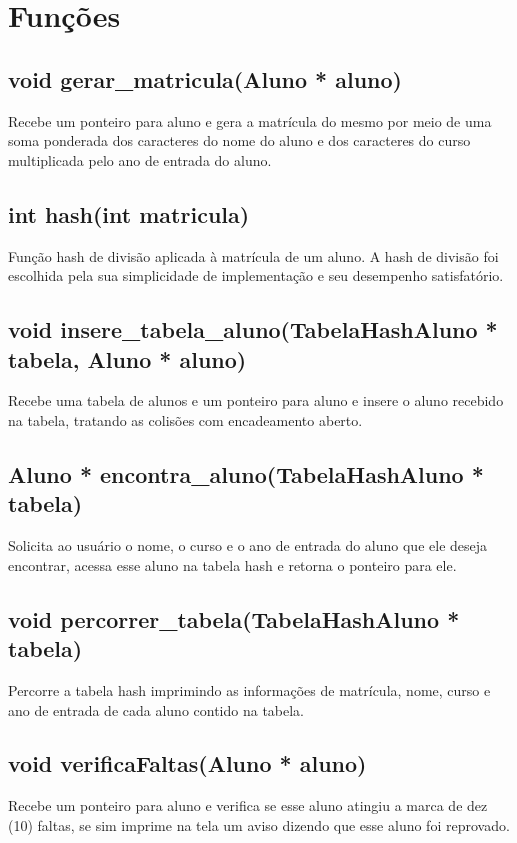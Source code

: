 \documentclass{article}
\begin{document}
\section{Funções}

\subsection{void gerar\_matricula(Aluno * aluno)}
Recebe um ponteiro para aluno e gera a matrícula do mesmo por meio de uma soma ponderada dos caracteres do nome do aluno e dos caracteres do curso multiplicada pelo ano de entrada do aluno.

\subsection{int hash(int matricula)}
Função hash de divisão aplicada à matrícula de um aluno. A hash de divisão foi escolhida pela sua simplicidade de implementação e seu desempenho satisfatório.

\subsection{void insere\_tabela\_aluno(TabelaHashAluno * tabela, Aluno * aluno)}
Recebe uma tabela de alunos e um ponteiro para aluno e insere o aluno recebido na tabela, tratando as colisões com encadeamento aberto.

\subsection{Aluno * encontra\_aluno(TabelaHashAluno * tabela)}
Solicita ao usuário o nome, o curso e o ano de entrada do aluno que ele deseja encontrar, acessa esse aluno na tabela hash e retorna o ponteiro para ele.

\subsection{void percorrer\_tabela(TabelaHashAluno * tabela)}
Percorre a tabela hash imprimindo as informações de matrícula, nome, curso e ano de entrada de cada aluno contido na tabela.

\subsection{void verificaFaltas(Aluno * aluno)}
Recebe um ponteiro para aluno e verifica se esse aluno atingiu a marca de dez (10) faltas, se sim imprime na tela um aviso dizendo que esse aluno foi reprovado.
\end{document}
